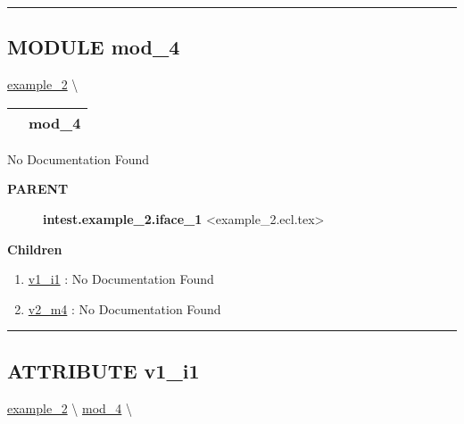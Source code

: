 \rule{\linewidth}{0.5pt}


\subsection*{\textsf{\colorbox{headtoc}{\color{white} MODULE}
mod\_4}}

\hypertarget{ecldoc:intest.example_2.mod_4}{}
\hspace{0pt} \hyperlink{ecldoc:intest.example_2}{example_2} \textbackslash 

{\renewcommand{\arraystretch}{1.5}
\begin{tabularx}{\textwidth}{|>{\raggedright\arraybackslash}l|X|}
\hline
\hspace{0pt}\mytexttt{\color{red} } & \textbf{mod\_4} \\
\hline
\end{tabularx}
}

\par





No Documentation Found










\par
\begin{description}
\item [\colorbox{tagtype}{\color{white} \textbf{\textsf{PARENT}}}] \textbf{intest.example\_2.iface\_1} <example\_2.ecl.tex>
\end{description}


\textbf{Children}
\begin{enumerate}
\item \hyperlink{ecldoc:intest.example_2.mod_4.v1_i1}{v1\_i1}
: No Documentation Found
\item \hyperlink{ecldoc:intest.example_2.mod_4.v2_m4}{v2\_m4}
: No Documentation Found
\end{enumerate}

\rule{\linewidth}{0.5pt}

\subsection*{\textsf{\colorbox{headtoc}{\color{white} ATTRIBUTE}
v1\_i1}}

\hypertarget{ecldoc:intest.example_2.mod_4.v1_i1}{}
\hspace{0pt} \hyperlink{ecldoc:intest.example_2}{example_2} \textbackslash 
\hspace{0pt} \hyperlink{ecldoc:intest.example_2.mod_4}{mod_4} \textbackslash 

